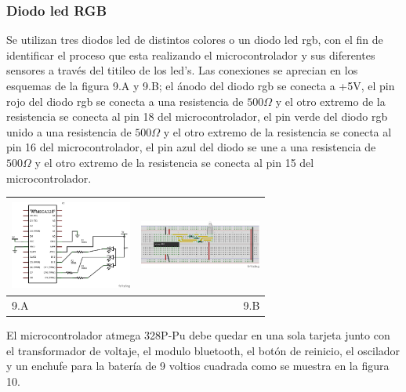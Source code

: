 \documentclass[12]{article}
\newenvironment{Figure}
{\par\medskip\noindent\minipage{\linewidth}}
{\endminipage\par\medskip}
\begin{document}
\begin{multicols}{2}
\subsubsection{Diodo led RGB}
Se utilizan tres diodos led de distintos colores o un diodo led rgb, con el fin de identificar el proceso que esta realizando el microcontrolador y sus diferentes sensores a través del titileo de los led's.
Las conexiones se aprecian en los esquemas de la figura 9.A y 9.B;  el ánodo del diodo rgb se conecta a +5V, el pin rojo del diodo rgb se conecta a una resistencia de $500\Omega$ y el otro extremo de la resistencia se conecta al pin 18 del microcontrolador, el pin verde del diodo rgb unido a una resistencia de $500\Omega$ y el otro extremo de la resistencia se conecta al pin 16 del microcontrolador, el pin azul del diodo se une a una resistencia de $500\Omega$ y el otro extremo de la resistencia se conecta al pin 15 del microcontrolador.\\
\begin{Figure}	
\center
\begin{tabular}{|l|r|}
\hline
\includegraphics[width=4cm, height=3cm]{img/rgbesq.png} & \includegraphics[width=4cm, height=3cm]{img/rgbmont.png} \\ \hline
9.A & 9.B \\ \hline
\end{tabular}
\label{fig:g9}
\end{Figure}
El microcontrolador atmega 328P-Pu debe quedar en una sola tarjeta junto con el transformador de voltaje, el modulo bluetooth, el botón de reinicio, el oscilador y un enchufe para la batería de 9 voltios cuadrada como se muestra en la figura 10.
\begin{Figure}
\center
\begin{tabular}{|l|r|}

\end{tabular}
\end{Figure}
\end{multicols}
\end{document}
